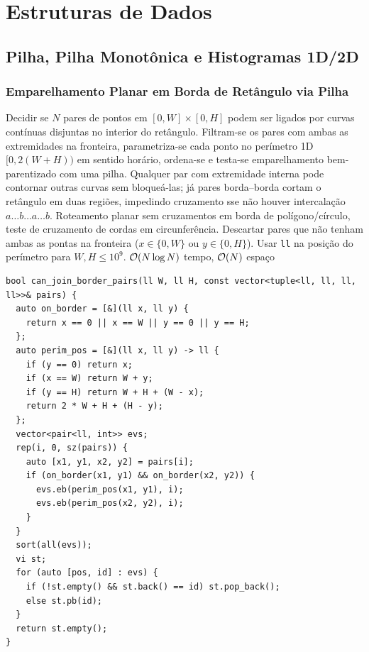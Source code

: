 \section{Estruturas de Dados}

\subsection{Pilha, Pilha Monotônica e Histogramas 1D/2D}

\subsubsection{Emparelhamento Planar em Borda de Retângulo via Pilha}
\algobox
  {Decidir se $N$ pares de pontos em $[0, W] \times [0, H]$ podem ser ligados por curvas contínuas disjuntas no interior do retângulo.}
  {Filtram-se os pares com ambas as extremidades na fronteira, parametriza-se cada ponto no perímetro 1D $[0, 2(W+H))$ em sentido horário, ordena-se e testa-se emparelhamento bem-parentizado com uma pilha.}
  {Qualquer par com extremidade interna pode contornar outras curvas sem bloqueá-las; já pares borda--borda cortam o retângulo em duas regiões, impedindo cruzamento sse não houver intercalação $a \dots b \dots a \dots b$.}
  {Roteamento planar sem cruzamentos em borda de polígono/círculo, teste de cruzamento de cordas em circunferência.}
  {Descartar pares que não tenham ambas as pontas na fronteira ($x \in \{0, W\}$ ou $y \in \{0, H\}$). Usar \texttt{ll} na posição do perímetro para $W, H \le 10^9$.}
  {$\mathcal{O}(N \log N)$ tempo, $\mathcal{O}(N)$ espaço}

\begin{lstlisting}
bool can_join_border_pairs(ll W, ll H, const vector<tuple<ll, ll, ll, ll>>& pairs) {
  auto on_border = [&](ll x, ll y) {
    return x == 0 || x == W || y == 0 || y == H;
  };
  auto perim_pos = [&](ll x, ll y) -> ll {
    if (y == 0) return x;
    if (x == W) return W + y;
    if (y == H) return W + H + (W - x);
    return 2 * W + H + (H - y);
  };
  vector<pair<ll, int>> evs;
  rep(i, 0, sz(pairs)) {
    auto [x1, y1, x2, y2] = pairs[i];
    if (on_border(x1, y1) && on_border(x2, y2)) {
      evs.eb(perim_pos(x1, y1), i);
      evs.eb(perim_pos(x2, y2), i);
    }
  }
  sort(all(evs));
  vi st;
  for (auto [pos, id] : evs) {
    if (!st.empty() && st.back() == id) st.pop_back();
    else st.pb(id);
  }
  return st.empty();
}
\end{lstlisting}

